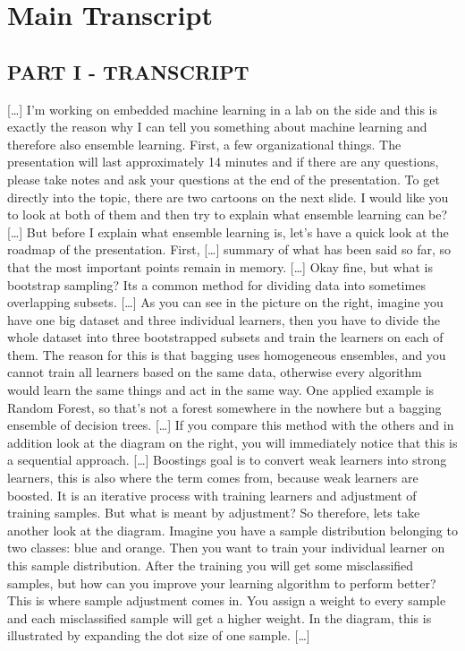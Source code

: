 \chapter{Main Transcript}

\section{PART I - TRANSCRIPT}

[\dots] I'm working on embedded machine learning in a lab on the side and this is exactly the reason why I can tell you something about machine learning and therefore also ensemble learning. First, a few organizational things. The presentation will last approximately 14 minutes and if there are any questions, please take notes and ask your questions at the end of the presentation. To get directly into the topic, there are two cartoons on the next slide. I would like you to look at both of them and then try to explain what ensemble learning can be? [\dots] But before I explain what ensemble learning is, let's have a quick look at the roadmap of the presentation. First, [\dots] summary of what has been said so far, so that the most important points remain in memory. [\dots] Okay fine, but what is bootstrap sampling? Its a common method for dividing data into sometimes overlapping subsets. [\dots] As you can see in the picture on the right, imagine you have one big dataset and three individual learners, then you have to divide the whole dataset into three bootstrapped subsets and train the learners on each of them. The reason for this is that bagging uses homogeneous ensembles, and you cannot train all learners based on the same data, otherwise every algorithm would learn the same things and act in the same way. One applied example is Random Forest, so that's not a forest somewhere in the nowhere but a bagging ensemble of decision trees. [\dots] If you compare this method with the others and in addition look at the diagram on the right, you will immediately notice that this is a sequential approach. [\dots] Boostings goal is to convert weak learners into strong learners, this is also where the term comes from, because weak learners are boosted.  It is an iterative process with training learners and adjustment of training samples. But what is meant by adjustment? So therefore, lets take another look at the diagram. Imagine you have a sample distribution belonging to two classes: blue and orange. Then you want to train your individual learner on this sample distribution. After the training you will get some misclassified samples, but how can you improve your learning algorithm to perform better? This is where sample adjustment comes in. You assign a weight to every sample and each misclassified sample will get a higher weight. In the diagram, this is illustrated by expanding the dot size of one sample. [\dots]

